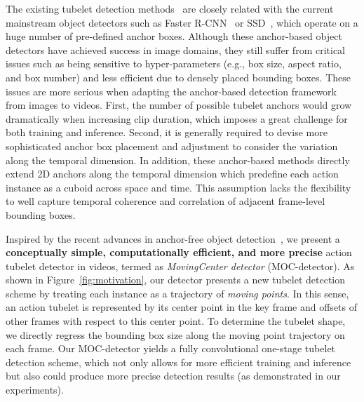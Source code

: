 \documentclass[runningheads]{llncs}
\begin{document}
The existing tubelet detection methods~\cite{saha2017amtnet,kalogeiton2017action,hou2017tube,yang2019step,zhao2019dance,song2019tacnet} are closely related with the current mainstream object detectors such as Faster R-CNN~\cite{ren2015faster} or SSD~\cite{liu2016ssd}, which operate on a huge number of pre-defined anchor boxes. Although these anchor-based object detectors have achieved success in image domains, they still suffer from critical issues such as being sensitive to hyper-parameters (e.g., box size, aspect ratio, and box number) and less efficient due to densely placed bounding boxes. These issues are more serious when adapting the anchor-based detection framework from images to videos. First, the number of possible tubelet anchors would grow dramatically when increasing clip duration, which imposes a great challenge for both training and inference. Second, it is generally required to devise more sophisticated anchor box placement and adjustment to consider the variation along the temporal dimension. In addition, these anchor-based methods directly extend 2D anchors along the temporal dimension which predefine each action instance as a cuboid across space and time. This assumption lacks the flexibility to well capture temporal coherence and correlation of adjacent frame-level bounding boxes.

Inspired by the recent advances in anchor-free object detection~\cite{YOLOV1,CornerNet,duan2019centernet,CenterNet,FCOS}, we present a {\bf conceptually simple, computationally efficient, and more precise} action tubelet detector in videos, termed as {\em MovingCenter detector} (MOC-detector). As shown in Figure~\ref{fig:motivation}, our detector presents a new tubelet detection scheme by treating each instance as a trajectory of {\em moving points}. In this sense, an action tubelet is represented by its center point in the key frame and offsets of other frames with respect to this center point. To determine the tubelet shape, we directly regress the bounding box size along the moving point trajectory on each frame. Our MOC-detector yields a fully convolutional one-stage tubelet detection scheme, which not only allows for more efficient training and inference but also could produce more precise detection results (as demonstrated in our experiments).
\end{document}
